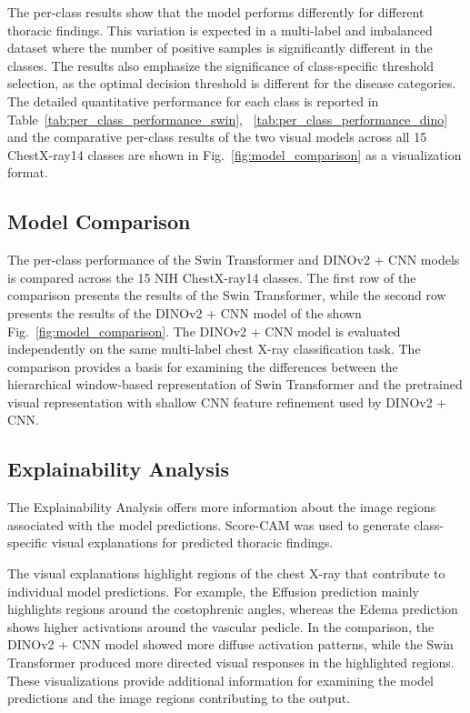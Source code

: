 \documentclass[conference]{IEEEtran}
\begin{document}
The per-class results show that the model performs differently for different thoracic findings. This variation is expected in a multi-label and imbalanced dataset where the number of positive samples is significantly different in the classes. The results also emphasize the significance of class-specific threshold selection, as the optimal decision threshold is different for the disease categories. The detailed quantitative performance for each class is reported in Table~\ref{tab:per_class_performance_swin}, ~\ref{tab:per_class_performance_dino} and the comparative per-class results of the two visual models across all 15 ChestX-ray14 classes are shown in Fig.~\ref{fig:model_comparison} as a visualization format.


\subsection{Model Comparison}
The per-class performance of the Swin Transformer and DINOv2 + CNN models is compared across the 15 NIH ChestX-ray14 classes. The first row of the comparison presents the results of the Swin Transformer, while the second row presents the results of the DINOv2 + CNN model of the shown Fig.~\ref{fig:model_comparison}.
The DINOv2 + CNN model is evaluated independently on the same multi-label chest X-ray classification task. 
The comparison provides a basis for examining the differences between the hierarchical window-based representation of Swin Transformer and the pretrained visual representation with shallow CNN feature refinement used by DINOv2 + CNN.
\subsection{Explainability Analysis}
The Explainability Analysis offers more information about the image regions associated with the model predictions. Score-CAM was used to generate class-specific visual explanations for predicted thoracic findings.

The visual explanations highlight regions of the chest X-ray that contribute to individual model predictions. For example, the Effusion prediction mainly highlights regions around the costophrenic angles, whereas the Edema prediction shows higher activations around the vascular pedicle.
In the comparison, the DINOv2 + CNN model showed more diffuse activation patterns, while the Swin Transformer produced more directed visual responses in the highlighted regions. These visualizations provide additional information for examining the model predictions and the image regions contributing to the output.
\end{document}
